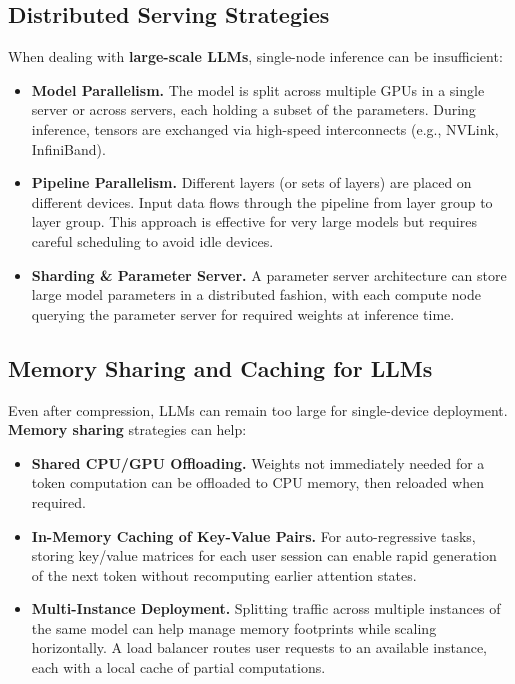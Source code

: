 \subsection{Distributed Serving Strategies}
\noindent
When dealing with \textbf{large-scale LLMs}, single-node inference can be insufficient:
\begin{itemize}
    \item \textbf{Model Parallelism.} The model is split across multiple GPUs in a single server or across servers, each holding a subset of the parameters. During inference, tensors are exchanged via high-speed interconnects (e.g., NVLink, InfiniBand).
    \item \textbf{Pipeline Parallelism.} Different layers (or sets of layers) are placed on different devices. Input data flows through the pipeline from layer group to layer group. This approach is effective for very large models but requires careful scheduling to avoid idle devices.
    \item \textbf{Sharding \& Parameter Server.} A parameter server architecture can store large model parameters in a distributed fashion, with each compute node querying the parameter server for required weights at inference time. 
\end{itemize}

\subsection{Memory Sharing and Caching for LLMs}
\noindent
Even after compression, LLMs can remain too large for single-device deployment. \textbf{Memory sharing} strategies can help:
\begin{itemize}
    \item \textbf{Shared CPU/GPU Offloading.} Weights not immediately needed for a token computation can be offloaded to CPU memory, then reloaded when required.
    \item \textbf{In-Memory Caching of Key-Value Pairs.} For auto-regressive tasks, storing key/value matrices for each user session can enable rapid generation of the next token without recomputing earlier attention states.
    \item \textbf{Multi-Instance Deployment.} Splitting traffic across multiple instances of the same model can help manage memory footprints while scaling horizontally. A load balancer routes user requests to an available instance, each with a local cache of partial computations.
\end{itemize}

